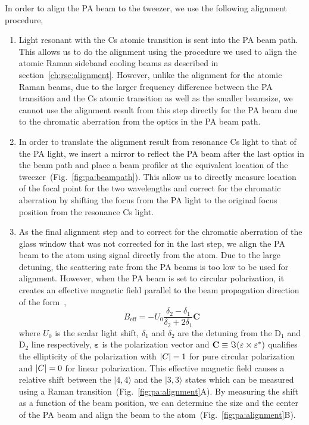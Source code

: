 In order to align the PA beam to the tweezer, we use the following alignment procedure,
\begin{enumerate}
\item Light resonant with the Cs atomic transition is sent into the PA beam path.
  This allows us to do the alignment using the procedure we used to align the
  atomic Raman sideband cooling beams as described in section~\ref{ch:rsc:alignment}.
  However, unlike the alignment for the atomic Raman beams,
  due to the larger frequency difference between the PA transition and the Cs atomic
  transition as well as the smaller beamsize,
  we cannot use the alignment result from this step directly for the PA beam
  due to the chromatic aberration from the optics in the PA beam path.
\item In order to translate the alignment result from resonance Cs light to that of the PA light,
  we insert a mirror to reflect the PA beam after the last optics in the beam path
  and place a beam profiler at the equivalent location of
  the tweezer~(Fig.~\ref{fig:pa:beampath}).
  This allow us to directly measure location of the focal point for the two wavelengths
  and correct for the chromatic aberration by shifting the focus from the PA light
  to the original focus position from the resonance Cs light.
\item As the final alignment step and to correct for the chromatic aberration of the
  glass window that was not corrected for in the last step,
  we align the PA beam to the atom using signal directly from the atom.
  Due to the large detuning, the scattering rate from the PA beams
  is too low to be used for alignment.
  However, when the PA beam is set to circular polarization, it creates an effective
  magnetic field parallel to the beam propagation direction
  of the form~\cite{thompson_coherence_2013},
  \[ B_{\mathrm{eff}}=-U_0\frac{\delta_2-\delta_1}{\delta_2+2\delta_1}\mathbf{C} \]
  where $U_0$ is the scalar light shift, $\delta_1$ and $\delta_2$ are the detuning from the
  $\mathrm{D}_1$ and $\mathrm{D}_2$ line respectively,
  $\mathbf{\varepsilon}$ is the polarization vector and
  $\mathbf{C}\equiv\Im{\left({\mathbf{\varepsilon}\times\mathbf{\varepsilon}^*}\right)}$
  qualifies the ellipticity of the polarization with
  ${\left|{C}\right|}=1$ for pure circular polarization and ${\left|{C}\right|}=0$ for linear polarization.
  This effective magnetic field causes a relative shift between the $|4,4\rangle$
  and the $|3,3\rangle$ states which can be measured using
  a Raman transition~(Fig.~\ref{fig:pa:alignment}A).
  By measuring the shift as a function of the beam position,
  we can determine the size and the center of the PA beam and align the beam to
  the atom~(Fig.~\ref{fig:pa:alignment}B).
\end{enumerate}

